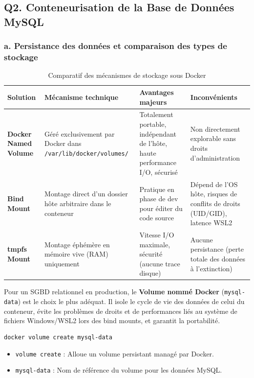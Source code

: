 \documentclass[11pt,a4paper]{article}
\begin{document}
\subsection{Q2. Conteneurisation de la Base de Données MySQL}

\subsubsection{a. Persistance des données et comparaison des types de stockage}
\begin{table}[H]
\centering
\small
\begin{tabularx}{\textwidth}{l p{4cm} p{4cm} p{3.8cm}}
\toprule
\textbf{Solution} & \textbf{Mécanisme technique} & \textbf{Avantages majeurs} & \textbf{Inconvénients} \\
\midrule
\textbf{Docker Named Volume} & Géré exclusivement par Docker dans \texttt{/var/lib/docker/volumes/} & Totalement portable, indépendant de l'hôte, haute performance I/O, sécurisé & Non directement explorable sans droits d'administration \\
\textbf{Bind Mount} & Montage direct d'un dossier hôte arbitraire dans le conteneur & Pratique en phase de dev pour éditer du code source & Dépend de l'OS hôte, risques de conflits de droits (UID/GID), latence WSL2 \\
\textbf{tmpfs Mount} & Montage éphémère en mémoire vive (RAM) uniquement & Vitesse I/O maximale, sécurité (aucune trace disque) & Aucune persistance (perte totale des données à l'extinction) \\
\bottomrule
\end{tabularx}
\caption{Comparatif des mécanismes de stockage sous Docker}
\label{tab:stockage}
\end{table}

\begin{justificationbox}
Pour un SGBD relationnel en production, le \textbf{Volume nommé Docker} (\texttt{mysql-data}) est le choix le plus adéquat. Il isole le cycle de vie des données de celui du conteneur, évite les problèmes de droits et de performances liés au système de fichiers Windows/WSL2 lors des bind mounts, et garantit la portabilité.
\end{justificationbox}

\begin{lstlisting}[language=bash]
docker volume create mysql-data
\end{lstlisting}
\begin{itemize}
  \item \texttt{volume create} : Alloue un volume persistant managé par Docker.
  \item \texttt{mysql-data} : Nom de référence du volume pour les données MySQL.
\end{itemize}
\end{document}
